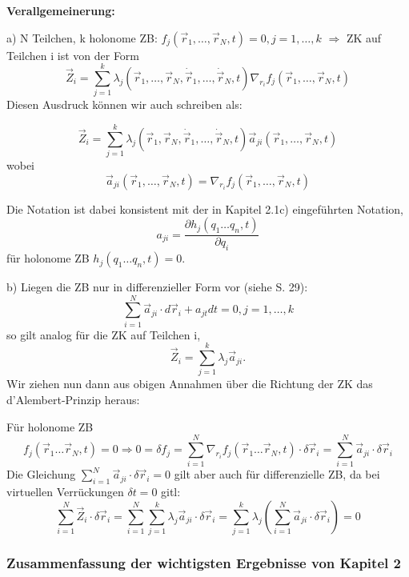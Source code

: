 \documentclass[10pt, letterpaper]{article}
\begin{document}
\textbf{Verallgemeinerung:}

a) N Teilchen, k holonome ZB: $f_j(\vec{r}_1,\dots,\vec{r}_N,t)=0, j=1,\dots,k$ $\Rightarrow$ ZK auf Teilchen i ist von der Form
$$\vec{Z}_i = \sum_{j=1}^k \lambda_j(\vec{r}_1,\dots,\vec{r}_N,\dot{\vec{r}}_1,\dots,\dot{\vec{r}}_N,t)\nabla_{r_i}f_j(\vec{r}_1,\dots,\vec{r}_N,t)$$
Diesen Ausdruck können wir auch schreiben als:

$$\vec{Z}_i = \sum_{j=1}^k \lambda_j(\vec{r}_1,\vec{r}_N,\dot{\vec{r}}_1,\dots,\dot{\vec{r}}_N,t)\vec{a}_{ji}(\vec{r}_1,\dots,\vec{r}_N,t)$$
wobei 
$$\vec{a}_{ji}(\vec{r}_1,\dots,\vec{r}_N,t) = \nabla_{r_i}f_j(\vec{r}_1,\dots,\vec{r}_N,t)$$

Die Notation ist dabei konsistent mit der in Kapitel 2.1c) eingeführten Notation,
$$a_{ji} = \frac{\partial h_j(q_1\dots q_n,t)}{\partial q_i}$$
für holonome ZB $h_j(q_1\dots q_n,t)=0$.



b) Liegen die ZB nur in differenzieller Form vor (siehe S. 29):
\[\sum_{i=1}^N \vec{a}_{ji}\cdot d\vec{r}_i + a_{jt}dt = 0, j=1,\dots,k\]
so gilt analog für die ZK auf Teilchen i,
\[\vec{Z}_i = \sum_{j=1}^k \lambda_j\vec{a}_{ji}.\]
Wir ziehen nun dann aus obigen Annahmen über die Richtung der ZK das d'Alembert-Prinzip heraus:

Für holonome ZB 
$$f_j(\vec{r}_1\dots\vec{r}_N,t)=0 \Rightarrow 0 = \delta f_j = \sum_{i=1}^N \nabla_{r_i}f_j(\vec{r}_1\dots\vec{r}_N,t)\cdot\delta\vec{r}_i = \sum_{i=1}^N \vec{a}_{ji}\cdot\delta\vec{r}_i$$
Die Gleichung $\sum_{i=1}^N \vec{a}_{ji}\cdot\delta\vec{r}_i=0$ gilt aber auch für differenzielle ZB, da bei virtuellen Verrückungen $\delta t = 0$ gitl:
$$\sum_{i=1}^N \vec{Z}_i\cdot\delta\vec{r}_i = \sum_{i=1}^N \sum_{j=1}^k \lambda_j\vec{a}_{ji}\cdot\delta\vec{r}_i = \sum_{j=1}^k \lambda_j(\sum_{i=1}^N \vec{a}_{ji}\cdot\delta\vec{r}_i) = 0$$




\subsubsection{Zusammenfassung der wichtigsten Ergebnisse von Kapitel 2}
\end{document}
